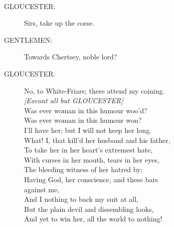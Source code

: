 \documentclass{article}
\begin{document}
\\
\begin{description}
\item[GLOUCESTER:] 
\hspace{1pt}Sirs, take up the corse.\\
\end{description}
\begin{description}
\item[GENTLEMEN:] 
\hspace{1pt}Towards Chertsey, noble lord?\\
\end{description}
\begin{description}
\item[GLOUCESTER:] 
\hspace{1pt}No, to White-Friars; there attend my coining.\\
{\it [Exeunt all but GLOUCESTER]}\\
\hspace{1pt}Was ever woman in this humour woo'd?\\
\hspace{1pt}Was ever woman in this humour won?\\
\hspace{1pt}I'll have her; but I will not keep her long.\\
\hspace{1pt}What! I, that kill'd her husband and his father,\\
\hspace{1pt}To take her in her heart's extremest hate,\\
\hspace{1pt}With curses in her mouth, tears in her eyes,\\
\hspace{1pt}The bleeding witness of her hatred by;\\
\hspace{1pt}Having God, her conscience, and these bars\\
\hspace{1pt}against me,\\
\hspace{1pt}And I nothing to back my suit at all,\\
\hspace{1pt}But the plain devil and dissembling looks,\\
\hspace{1pt}And yet to win her, all the world to nothing!\\

\end{description}
\end{document}
